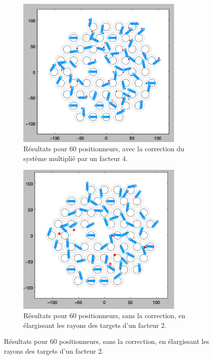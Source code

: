 \begin{figure}[h]
\begin{center}
	\begin{subfigure}{0.49\textwidth}
		\includegraphics[width=0.9\textwidth]{set_target/correction_x4.png}
		\caption{Résultats pour 60 positionneurs, avec la correction du système multiplié par un facteur 4.}
		\label{fig:correction:normal}
	\end{subfigure}
	\begin{subfigure}{0.49\textwidth}
		\includegraphics[width=0.9\textwidth]{set_target/sans_correction_r2.png}
		\caption{Résultats pour 60 positionneurs, sans la correction, en élargissant les rayons des targets d'un facteur 2.}
		\label{fig:correction:normal}
	\end{subfigure}
	

\end{center}
\end{figure}
